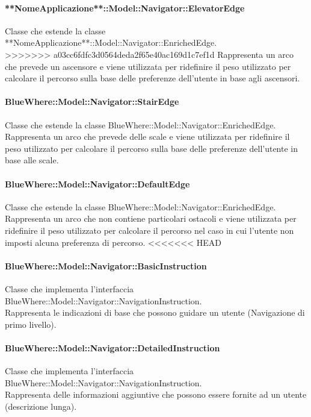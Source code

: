 \documentclass[../SpecificaTecnica.tex]{subfiles}
\begin{document}
				\paragraph{**NomeApplicazione**::Model::Navigator::ElevatorEdge}
					Classe che estende la classe **NomeApplicazione**::Model::Navigator::EnrichedEdge. \\
>>>>>>> a03cc6fdfc3d0564deda2f65e40ac169d1c7ef1d
					Rappresenta un arco che prevede un ascensore e viene utilizzata per ridefinire il peso utilizzato per calcolare il percorso sulla base delle preferenze dell'utente in base agli ascensori.
				\paragraph{BlueWhere::Model::Navigator::StairEdge}
					Classe che estende la classe BlueWhere::Model::Navigator::EnrichedEdge. \\
					Rappresenta un arco che prevede delle scale e viene utilizzata per ridefinire il peso utilizzato per calcolare il percorso sulla base delle preferenze dell'utente in base alle scale.
				\paragraph{BlueWhere::Model::Navigator::DefaultEdge}
					Classe che estende la classe BlueWhere::Model::Navigator::EnrichedEdge. \\
					Rappresenta un arco che non contiene particolari ostacoli e viene utilizzata per ridefinire il peso utilizzato per calcolare il percorso nel caso in cui l'utente non imposti alcuna preferenza di percorso.
<<<<<<< HEAD
				\paragraph{BlueWhere::Model::Navigator::BasicInstruction}
					Classe che implementa l'interfaccia BlueWhere::Model::Navigator::NavigationInstruction. \\
					Rappresenta le indicazioni di base che possono guidare un utente (Navigazione di primo livello).
				\paragraph{BlueWhere::Model::Navigator::DetailedInstruction}
					Classe che implementa l'interfaccia BlueWhere::Model::Navigator::NavigationInstruction. \\
					Rappresenta delle informazioni aggiuntive che possono essere fornite ad un utente (descrizione lunga).
\end{document}
